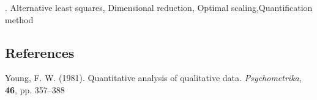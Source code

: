 \documentclass[12pt]{article}
\begin{document}
\vskip 2mm

.
Alternative least squares, Dimensional reduction, Optimal scaling,Quantification method
%        
%
%        

\subsection*{References}

\begin{description}
	
\item
Young, F. W. (1981). Quantitative analysis of qualitative data. \textit{Psychometrika}, \textbf{46}, pp. 357--388
\end{description}
\end{document}
